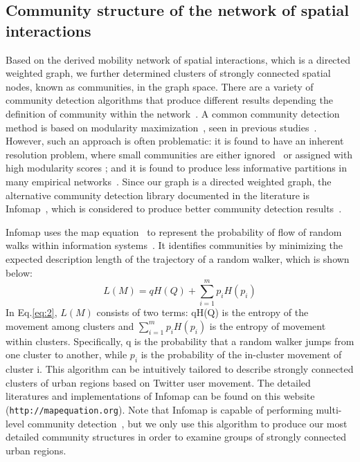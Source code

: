 \documentclass[]{tGIS2e}
\begin{document}
\subsection{Community structure of the network of spatial interactions}
Based on the derived mobility network of spatial interactions, which is a directed weighted graph, we further determined clusters of strongly connected spatial nodes, known as communities, in the graph space. 
There are a variety of community detection algorithms that produce different results depending the definition of community within the network~\citep{coscia2011}.
A common community detection method is based on modularity maximization~\citep{newman2006}, seen in previous studies~\citep{hawelka,ratti2010,song2012}.
However, such an approach is often problematic: it is found to have an inherent resolution problem, where small communities are either ignored~\citep{fortunato2007} or assigned with high modularity scores \citep{guimera2004}; and it is found to produce less informative partitions in many empirical networks~\citep{good2010}.
Since our graph is a directed weighted graph, the alternative community detection library documented in the literature is Infomap~\citep{domenico2015,rosvall2008}, which is considered to produce better community detection results~\citep{lancichinetti2009}.

Infomap uses the map equation~\citep{rosvall2010} to represent the probability of flow of random walks within information systems~\citep{rosvall2008}.
It identifies communities by minimizing the expected description length of the trajectory of a random walker, which is shown below:
\begin{equation} \label{eq:2}
L(M)=qH(Q) + \sum_{i=1}^{m} p_{i}H(p_{i})
\end{equation}
In Eq.\eqref{eq:2}, $L(M)$ consists of two terms: qH(Q) is the entropy of the movement among clusters and $ \sum_{i=1}^{m} p_{i}H(p_{i})$ is the entropy of movement within clusters. 
Specifically, q is the probability that a random walker jumps from one cluster to another, while $p_i$ is the probability of the in-cluster movement of cluster i.
This algorithm can be intuitively tailored to describe strongly connected clusters of urban regions based on Twitter user movement.
The detailed literatures and implementations of Infomap can be found on this website ({\tt{http://mapequation.org}}).
Note that Infomap is capable of performing multi-level community detection~\citep{domenico2015}, but we only use this algorithm to produce our most detailed community structures in order to examine groups of strongly connected urban regions.
\end{document}
